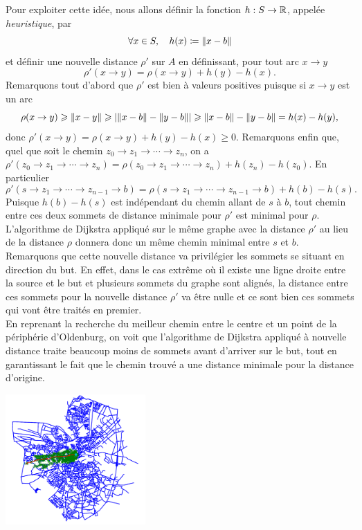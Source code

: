 \documentclass{magnolia}
\begin{document}
Pour exploiter cette idée, nous allons définir la fonction $h:S\to\mathbb{R}$, appelée
\emph{heuristique}, par
\[\forall x\in S,\quad h(x)\coloneqq\left\|x-b\right\|\]
et définir une nouvelle distance $\rho'$ sur $A$ en définissant, pour tout
arc $x\to y$
\[\rho'(x\to y)=\rho(x\to y)+h(y)-h(x).\]
Remarquons tout d'abord que $\rho'$ est bien à valeurs positives puisque si $x\to y$ est
un arc
\[\rho(x\to y)\geqslant \left\|x-y\right\|\geqslant \left|\left\|x-b\right\| - \left\|y-b\right\|\right|\geqslant \left\|x-b\right\| - \left\|y-b\right\|=h(x)-h(y),\]
donc $\rho'(x\to y)=\rho(x\to y)+h(y)-h(x)\geq 0$. Remarquons enfin que, quel que
soit le chemin $z_0\to z_1\to\cdots\to z_n$, on a
$\rho'(z_0\to z_1\to\cdots\to z_n)=\rho(z_0\to z_1\to\cdots\to z_n)+h(z_n)-h(z_0)$.
En particulier
\[\rho'(s\to z_1\to\cdots\to z_{n-1}\to b)=\rho(s\to z_1\to\cdots\to z_{n-1}\to b)+h(b)-h(s).\]
Puisque $h(b)-h(s)$ est indépendant du chemin allant de $s$ à $b$,
tout chemin entre ces deux sommets de distance minimale pour $\rho'$ est minimal
pour $\rho$. L'algorithme de Dijkstra appliqué sur le même graphe
avec la distance $\rho'$ au lieu de la distance $\rho$ donnera donc un même chemin
minimal entre $s$ et $b$. Remarquons que cette nouvelle distance va privilégier les
sommets se situant en direction du but. En effet, dans le cas extrême où il existe
une ligne droite entre la source et le but et plusieurs sommets du graphe sont alignés,
la distance entre ces sommets pour la nouvelle distance $\rho'$ va être nulle et ce
sont bien ces sommets qui vont être traités en premier.\\

En reprenant la recherche du meilleur chemin entre le centre et un point de la périphérie
d'Oldenburg, on voit que l'algorithme de Dijkstra appliqué à
nouvelle distance traite beaucoup moins de sommets avant d'arriver sur le but, tout en garantissant le fait que
le chemin trouvé a une distance minimale pour la distance d'origine.

\begin{center}
\includegraphics[width=0.4\textwidth]{../../Commun/Images/python-cours-graphe-astar-2.png}
\end{center}

\end{document}
